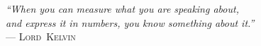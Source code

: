 {\sffamily\itshape
``When you can measure what you are speaking about,\\
and express it in numbers, you know something about it.''\\}
--- \textsc{Lord~Kelvin}
